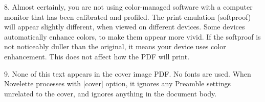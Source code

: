 \documentclass{novelette} %
\begin{document}
8. Almost certainly, you are not using color-managed software with a computer
monitor that has been calibrated and profiled. The print emulation (softproof)
will appear slightly different, when viewed on different devices. Some devices
automatically enhance colors, to make them appear more vivid.
If the softproof is not noticeably duller than the original,
it means your device uses color enhancement. This does not affect how the
PDF will print.

9. None of this text appears in the cover image PDF. No fonts are used.
When Novelette processes with [cover] option, it ignores any Preamble
settings unrelated to the cover, and ignores anything in the document body.

\makeatletter\nocle@rtoendtrue\makeatother
\end{document}
